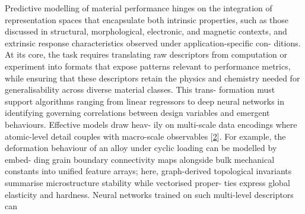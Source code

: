 \documentclass[
]{article}
\begin{document}
Predictive modelling of material performance hinges on the integration
of representation spaces that encapsulate both intrinsic properties,
such as those discussed in structural, morphological, electronic, and
magnetic contexts, and extrinsic response characteristics observed under
application-specific con- ditions. At its core, the task requires
translating raw descriptors from computation or experiment into formats
that expose patterns relevant to performance metrics, while ensuring
that these descriptors retain the physics and chemistry needed for
generalisability across diverse material classes. This trans- formation
must support algorithms ranging from linear regressors to deep neural
networks in identifying governing correlations between design variables
and emergent behaviours. Effective models draw heav- ily on multi-scale
data encodings where atomic-level detail couples with macro-scale
observables {[}\hyperref[_bookmark42]{2}{]}. For example, the
deformation behaviour of an alloy under cyclic loading can be modelled
by embed- ding grain boundary connectivity maps alongside bulk
mechanical constants into unified feature arrays; here, graph-derived
topological invariants summarise microstructure stability while
vectorised proper- ties express global elasticity and hardness. Neural
networks trained on such multi-level descriptors can
\end{document}
